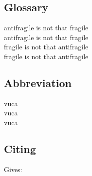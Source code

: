 \subsection{Glossary}

\gls{antifragile} is not that \gls{fragile}\\
\Gls{antifragile} is not that \Gls{fragile}\\
\gls{fragile} is not that \gls{antifragile}\\
\Gls{fragile} is not that \Gls{antifragile}\\

\subsection{Abbreviation}

\acrfull{vuca}\\
\acrlong{vuca}\\
\acrshort{vuca}\\

\subsection{Citing}
\begin{verbatim*}
	\parencite{Bliek2017}
	\citeyear{Bliek2017}
	\citeauthor{Bliek2017}
\end{verbatim*}
Gives:\\
\parencite{Bliek2017}\\
\citeyear{Bliek2017}\\
\citeauthor{Bliek2017}
